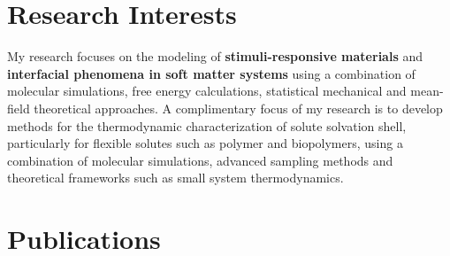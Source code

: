 \documentclass[a4paper,14pt]{article}
\begin{document}
\section*{\large Research Interests}
My research focuses on the modeling of \textbf{stimuli-responsive materials}
and \textbf{interfacial phenomena in soft matter systems} using a combination
of molecular simulations, free energy calculations, statistical mechanical and
mean-field theoretical approaches. A complimentary focus of my research is to
develop methods for the thermodynamic characterization of solute solvation
shell, particularly for flexible solutes such as polymer and biopolymers, using
a combination of molecular simulations, advanced sampling methods and
theoretical frameworks such as small system thermodynamics.
 \section*{\large Publications}
\end{document}
